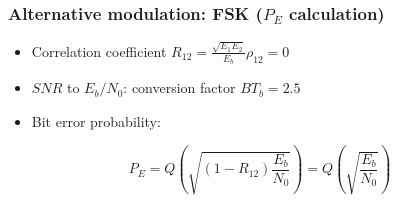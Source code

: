 \documentclass{beamer}
\begin{document}
\begin{frame}
	\frametitle{Alternative modulation: FSK ($P_E$ calculation)}
	\begin{itemize}
		\item Correlation coefficient $R_{12} = \frac{\sqrt{E_1 E_2}}{E_b}\rho_{12} = 0$
		\item $SNR$ to $E_b/N_0$: conversion factor $B T_b = 2.5$
		\item Bit error probability:
	\end{itemize}
	\begin{equation}
		P_E = Q\left(\sqrt{\left(1 - R_{12}\right) \frac{E_b}{N_0}}\right) = Q\left(\sqrt{\frac{E_b}{N_0}}\right)
	\end{equation}
\end{frame}
\end{document}
